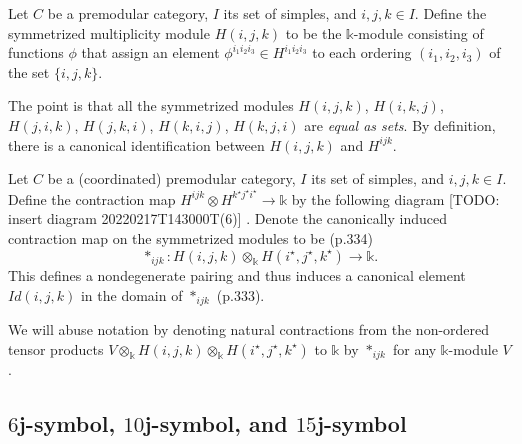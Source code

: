 \begin{definition}\label{def/symmetrized-multiplicity-module}
  Let $C$ be a premodular category, $I$ its set of simples, and
  $i, j, k \in I$. Define the symmetrized multiplicity module
  $H(i,j,k)$ to be the $\mathbb{k}$-module consisting of
  functions $\phi$ that assign an element
  $\phi^{i_{1}i_{2}i_{3}} \in H^{i_{1}i_{2}i_{3}}$ to each
  ordering $(i_{1}, i_{2}, i_{3})$ of the set $\{i, j, k\}$.
\end{definition}

\noindent The point is that all the symmetrized modules
$H(i,j,k)$, $H(i,k,j)$, $H(j,i,k)$, $H(j,k,i)$, $H(k,i,j)$,
$H(k,j,i)$ are \textit{equal as sets}. By definition, there is a
canonical identification between $H(i,j,k)$ and $H^{ijk}$.

\begin{definition}[contraction]\label{def/contraction}
  Let $C$ be a (coordinated) premodular category, $I$ its set of
  simples, and $i, j, k \in I$. Define the contraction map
  $H^{ijk} \otimes H^{k^{\star}j^{\star}i^{\star}} \to \mathbb{k}$
  by the following diagram [TODO: insert diagram
  20220217T143000T(6)] . Denote the canonically
  induced contraction map on the symmetrized modules to be
  (p.334)
  $$\ast_{ijk}: H(i,j,k) \otimes_{\mathbb{k}} H(i^{\star}, j^{\star}, k^{\star}) \to \mathbb{k}.$$
  This defines a nondegenerate pairing and thus induces a
  canonical element $Id(i,j,k)$ in the domain of $\ast_{ijk}$
  (p.333).
\end{definition}

\noindent We will abuse notation by denoting natural contractions
from the non-ordered tensor products
$V \otimes_{\mathbb{k}} H(i,j,k) \otimes_{\mathbb{k}} H(i^{\star}, j^{\star}, k^{\star})$
to $\mathbb{k}$ by $\ast_{ijk}$ for any $\mathbb{k}$-module $V$.

\subsection{$6$j-symbol, $10$j-symbol, and $15$j-symbol}

\newcommand{\sixJSymbol}[6]{\begin{bmatrix}
  #1 & #2 & #3 \\
  #4 & #5 & #6 \\
\end{bmatrix}}

\newcommand{\normalizedSixJSymbol}[6]{\begin{vmatrix}
  #1 & #2 & #3 \\
  #4 & #5 & #6 \\
\end{vmatrix}}

